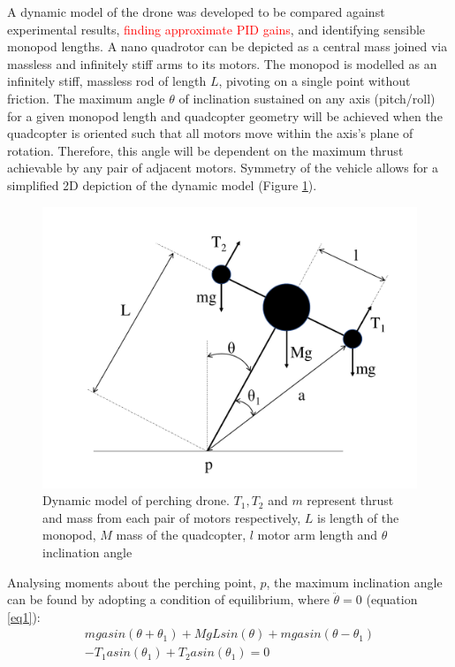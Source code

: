 \documentclass[12pt,a4paper]{article}
\begin{document}
A dynamic model of the drone was developed to be compared against experimental results, \textcolor{red}{finding approximate PID gains}, and identifying sensible monopod lengths. A nano quadrotor can be depicted as a central mass joined via massless and infinitely stiff arms to its motors. The monopod is modelled as an infinitely stiff, massless rod of length $L$, pivoting on a single point without friction. The maximum angle $\theta$ of inclination sustained on any axis (pitch/roll) for a given monopod length and quadcopter geometry will be achieved when the quadcopter is oriented such that all motors move within the axis's plane of rotation. Therefore, this angle will be dependent on the maximum thrust achievable by any pair of adjacent motors. Symmetry of the vehicle allows for a simplified 2D depiction of the dynamic model (Figure \ref{fig2}).

\begin{figure}[h!]
\centering
 \includegraphics[scale=0.5]{dynamic_model.pdf}
  \caption{Dynamic model of perching drone. $T_1,T_2$ and $m$ represent thrust and mass from each pair of motors respectively, $L$ is length of the monopod, $M$ mass of the quadcopter, $l$ motor arm length and $\theta$ inclination angle}
  \label{fig2}
\end{figure}
Analysing moments about the perching point, $p$, the maximum inclination angle can be found by adopting a condition of equilibrium, where $\ddot{\theta} = 0$ (equation \ref{eq1}):
\begin{equation}
\begin{split}
mgasin(\theta + \theta_1) + MgLsin(\theta) + 
mgasin(\theta-\theta_1) \\
-T_{1}asin(\theta_1) + T_2asin(\theta_1) = 0
\end{split}
\label{eq1}
\end{equation}
\end{document}
